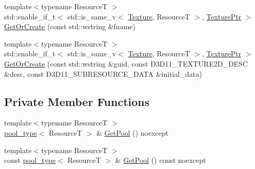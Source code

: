 \begin{DoxyCompactItemize}
\item 
{\footnotesize template$<$typename ResourceT $>$ }\\std\+::enable\+\_\+if\+\_\+t$<$ std\+::is\+\_\+same\+\_\+v$<$ \mbox{\hyperlink{classmage_1_1rendering_1_1_texture}{Texture}}, ResourceT $>$, \mbox{\hyperlink{namespacemage_1_1rendering_a6f3ae54f825328465b0cdde0f0de4a36}{Texture\+Ptr}} $>$ \mbox{\hyperlink{classmage_1_1rendering_1_1_resource_manager_afb762d819221365732ebd22b0a78c443}{Get\+Or\+Create}} (const std\+::wstring \&fname)
\item 
{\footnotesize template$<$typename ResourceT $>$ }\\std\+::enable\+\_\+if\+\_\+t$<$ std\+::is\+\_\+same\+\_\+v$<$ \mbox{\hyperlink{classmage_1_1rendering_1_1_texture}{Texture}}, ResourceT $>$, \mbox{\hyperlink{namespacemage_1_1rendering_a6f3ae54f825328465b0cdde0f0de4a36}{Texture\+Ptr}} $>$ \mbox{\hyperlink{classmage_1_1rendering_1_1_resource_manager_aae4985253e7645a90ff2db52f631e66b}{Get\+Or\+Create}} (const std\+::wstring \&guid, const D3\+D11\+\_\+\+T\+E\+X\+T\+U\+R\+E2\+D\+\_\+\+D\+E\+SC \&desc, const D3\+D11\+\_\+\+S\+U\+B\+R\+E\+S\+O\+U\+R\+C\+E\+\_\+\+D\+A\+TA \&initial\+\_\+data)
\end{DoxyCompactItemize}
\subsection*{Private Member Functions}
\begin{DoxyCompactItemize}
\item 
{\footnotesize template$<$typename ResourceT $>$ }\\\mbox{\hyperlink{classmage_1_1rendering_1_1_resource_manager_ab21a4e280087032ee533f267bd9bf602}{pool\+\_\+type}}$<$ ResourceT $>$ \& \mbox{\hyperlink{classmage_1_1rendering_1_1_resource_manager_a91891df90f569c3f3f72a51c8a2f6ae5}{Get\+Pool}} () noexcept
\item 
{\footnotesize template$<$typename ResourceT $>$ }\\const \mbox{\hyperlink{classmage_1_1rendering_1_1_resource_manager_ab21a4e280087032ee533f267bd9bf602}{pool\+\_\+type}}$<$ ResourceT $>$ \& \mbox{\hyperlink{classmage_1_1rendering_1_1_resource_manager_a5cba7eab859779a7cb74d5f2cef21173}{Get\+Pool}} () const noexcept
\end{DoxyCompactItemize}
